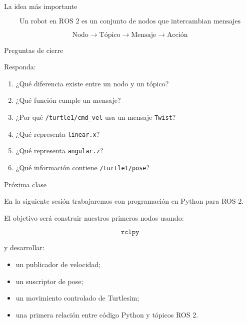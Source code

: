\documentclass[aspectratio=169]{beamer}
\begin{document}
\begin{frame}{La idea más importante}

\[
\boxed{
    \text{Un robot en ROS 2 es un conjunto de nodos que intercambian mensajes}
}
\]

\vspace{0.4cm}

\[
\text{Nodo}
\rightarrow
\text{Tópico}
\rightarrow
\text{Mensaje}
\rightarrow
\text{Acción}
\]

\vspace{0.3cm}


\end{frame}

\begin{frame}{Preguntas de cierre}

Responda:

\begin{enumerate}
    \item ¿Qué diferencia existe entre un nodo y un tópico?
    \item ¿Qué función cumple un mensaje?
    \item ¿Por qué \texttt{/turtle1/cmd\_vel} usa un mensaje \texttt{Twist}?
    \item ¿Qué representa \texttt{linear.x}?
    \item ¿Qué representa \texttt{angular.z}?
    \item ¿Qué información contiene \texttt{/turtle1/pose}?
\end{enumerate}

\end{frame}

\begin{frame}{Próxima clase}

En la siguiente sesión trabajaremos con programación en Python para ROS 2.

El objetivo será construir nuestros primeros nodos usando:

\[
\boxed{\texttt{rclpy}}
\]

y desarrollar:

\begin{itemize}
    \item un publicador de velocidad;
    \item un suscriptor de pose;
    \item un movimiento controlado de Turtlesim;
    \item una primera relación entre código Python y tópicos ROS 2.
\end{itemize}

\end{frame}

\begin{frame}
\centering
{}
\end{frame}
\end{document}
